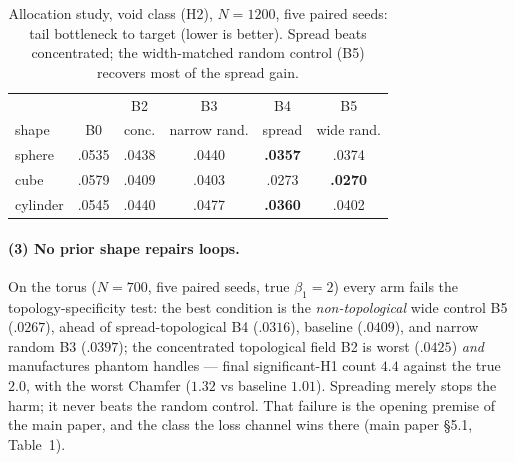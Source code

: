 \begin{table}[t]
\centering
\caption{Allocation study, void class (H2), $N{=}1200$, five paired seeds:
tail bottleneck to target (lower is better). Spread beats concentrated;
the width-matched random control (B5) recovers most of the spread gain.}
\label{tab:companion}
\footnotesize
\setlength{\tabcolsep}{3pt}
\begin{tabular}{lccccc}
\toprule
 & & B2 & B3 & B4 & B5 \\
shape & B0 & conc. & narrow rand. & spread & wide rand. \\
\midrule
sphere   & .0535 & .0438 & .0440 & \textbf{.0357} & .0374 \\
cube     & .0579 & .0409 & .0403 & .0273 & \textbf{.0270} \\
cylinder & .0545 & .0440 & .0477 & \textbf{.0360} & .0402 \\
\bottomrule
\end{tabular}
\end{table}

\paragraph{(3) No prior shape repairs loops.} On the torus ($N{=}700$, five
paired seeds, true $\beta_1{=}2$) every arm fails the topology-specificity
test: the best condition is the \emph{non-topological} wide control B5
($.0267$), ahead of spread-topological B4 ($.0316$), baseline ($.0409$), and
narrow random B3 ($.0397$); the concentrated topological field B2 is worst
($.0425$) \emph{and} manufactures phantom handles --- final significant-H1
count $4.4$ against the true $2.0$, with the worst Chamfer ($1.32$ vs
baseline $1.01$). Spreading merely stops the harm; it never beats the random
control. That failure is the opening premise of the main paper, and the
class the loss channel wins there (main paper \S5.1, Table~1).
